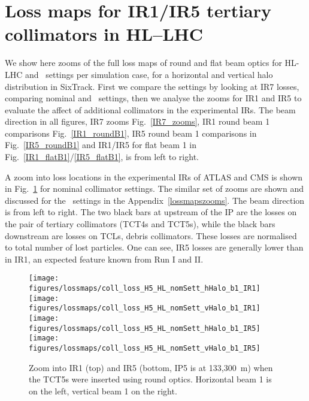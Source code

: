 \section{Loss maps for IR1/IR5 tertiary collimators in HL--LHC \label{lossmapszooms}}

We show here zooms of the full loss maps of round and flat beam optics for HL-LHC and \twosigmaret~settings per simulation case, for a horizontal and vertical halo distribution in SixTrack. First we compare the settings by looking at IR7 losses, comparing nominal and \twosigmaret~settings, then we analyse the zooms for IR1 and IR5 to evaluate the affect of additional collimators in the experimental IRs. The beam direction in all figures, IR7 zooms Fig.~\ref{IR7_zooms}, IR1 round beam 1 comparisons Fig.~\ref{IR1_roundB1}, IR5 round beam 1 comparisons in Fig.~\ref{IR5_roundB1} and IR1/IR5 for flat beam 1 in Fig.~\ref{IR1_flatB1}/\ref{IR5_flatB1}, is from left to right. 



A zoom into loss locations in the experimental IRs of ATLAS and CMS is shown in Fig.~\ref{IR15_roundB1_nomSett} for nominal collimator settings. The similar set of zooms are shown and discussed for the \twosigmaret~settings in the Appendix~\ref{lossmapszooms}. The beam direction is from left to right. The two black bars at upstream of the IP are the losses on the pair of tertiary collimators (TCT4s and TCT5s), while the black bars downstream are losses on TCLs, debris collimators. These losses are normalised to total number of lost particles. One can see, IR5 losses are generally lower than in IR1, an expected feature known from Run I and II. %

\begin{figure} [!htb]
\begin{center}

\texttt{[image: figures/lossmaps/coll\_loss\_H5\_HL\_nomSett\_hHalo\_b1\_IR1]}
\texttt{[image: figures/lossmaps/coll\_loss\_H5\_HL\_nomSett\_vHalo\_b1\_IR1]}
\texttt{[image: figures/lossmaps/coll\_loss\_H5\_HL\_nomSett\_hHalo\_b1\_IR5]}
\texttt{[image: figures/lossmaps/coll\_loss\_H5\_HL\_nomSett\_vHalo\_b1\_IR5]}
\end{center}
\vspace{-0.3cm}
 \caption{Zoom into IR1 (top) and IR5 (bottom, IP5 is at 133,300~m) when the TCT5s were inserted using round optics. Horizontal beam 1 is on the left, vertical beam 1 on the right.
  \label{IR15_roundB1_nomSett}}
\end{figure}



